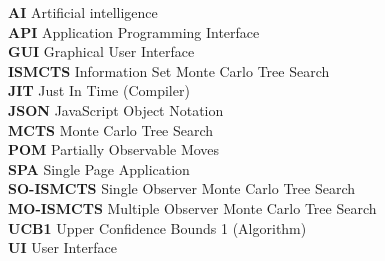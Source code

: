 
\textbf{AI} Artificial intelligence \\
\textbf{API} Application Programming Interface \\
\textbf{GUI} Graphical User Interface \\
\textbf{ISMCTS} Information Set Monte Carlo Tree Search \\
\textbf{JIT} Just In Time (Compiler) \\
\textbf{JSON} JavaScript Object Notation \\
\textbf{MCTS} Monte Carlo Tree Search \\
\textbf{POM} Partially Observable Moves \\
\textbf{SPA} Single Page Application \\
\textbf{SO-ISMCTS} Single Observer Monte Carlo Tree Search\\
\textbf{MO-ISMCTS} Multiple Observer Monte Carlo Tree Search\\
\textbf{UCB1} Upper Confidence Bounds 1 (Algorithm) \\
\textbf{UI} User Interface
